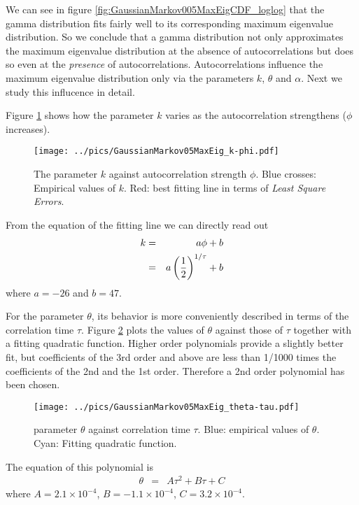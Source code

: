 \documentclass{book}
\begin{document}
We can see in figure \ref{fig:GaussianMarkov005MaxEigCDF_loglog} that
the gamma distribution fits fairly well to its corresponding maximum
eigenvalue distribution. So we conclude that a gamma distribution not
only approximates the maximum eigenvalue distribution at the absence of
autocorrelations but does so even at the {\it presence} of
autocorrelations. Autocorrelations influence the maximum eigenvalue
distribution only via the parameters $k$, $\theta$ and $\alpha$. Next
we study this influcence in detail.


Figure \ref{fig:GaussianMarkovMaxEig_k-phi} shows how the parameter $k$
varies as the autocorrelation strengthens ($\phi$ increases). 
\begin{figure}[htb!]
  \vspace{-10mm}
  \centering
    \texttt{[image: ../pics/GaussianMarkov05MaxEig\_k-phi.pdf]}
    \caption{\footnotesize The parameter $k$ against autocorrelation strength
      $\phi$. Blue crosses: Empirical values of $k$. Red: best fitting
      line in terms of {\it Least Square Errors}.}
  \label{fig:GaussianMarkovMaxEig_k-phi}
\end{figure}
From the equation of the fitting line we can directly read out
\begin{eqnarray*}
  k &=& a\phi + b \\
  &=& a\left(1 \over 2\right)^{1/\tau} + b
\end{eqnarray*}
where $a = -26$ and $b = 47$.

For the parameter $\theta$, its behavior is more conveniently
described in terms of the correlation time $\tau$. Figure
\ref{fig:GaussianMarkovMaxEig_theta-tau} plots the values of $\theta$
against those of $\tau$ together with a fitting quadratic
function. Higher order polynomials provide a slightly better
fit, but coefficients of the 3rd order and above are less than 1/1000
times the coefficients of the 2nd and the 1st order. Therefore a 2nd
order polynomial has been chosen.
\begin{figure}[htb!]
  \vspace{-15mm}
  \centering
  \texttt{[image: ../pics/GaussianMarkov05MaxEig\_theta-tau.pdf]} 
  \caption{\footnotesize parameter $\theta$ against correlation time $\tau$. Blue:
    empirical values of $\theta$. Cyan: Fitting quadratic function.}
  \label{fig:GaussianMarkovMaxEig_theta-tau}
\end{figure}
The equation of this polynomial is
\begin{eqnarray*}
  \theta &=& A\tau^2 + B\tau + C
\end{eqnarray*}
where $A = 2.1\times 10^{-4}$, $B = -1.1\times 10^{-4}$, $C =
3.2\times 10^{-4}$.
\end{document}
